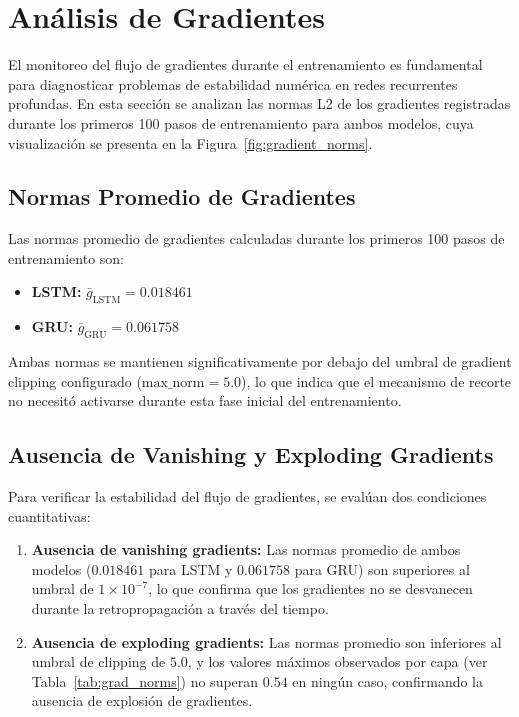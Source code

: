 \section{Análisis de Gradientes}

El monitoreo del flujo de gradientes durante el entrenamiento es fundamental para
diagnosticar problemas de estabilidad numérica en redes recurrentes profundas. En
esta sección se analizan las normas L2 de los gradientes registradas durante los
primeros 100 pasos de entrenamiento para ambos modelos, cuya visualización se
presenta en la Figura~\ref{fig:gradient_norms}.

\subsection{Normas Promedio de Gradientes}

Las normas promedio de gradientes calculadas durante los primeros 100 pasos de
entrenamiento son:

\begin{itemize}
    \item \textbf{LSTM:} $\bar{g}_{\text{LSTM}} = 0.018461$
    \item \textbf{GRU:} $\bar{g}_{\text{GRU}} = 0.061758$
\end{itemize}

Ambas normas se mantienen significativamente por debajo del umbral de gradient
clipping configurado ($\text{max\_norm} = 5.0$), lo que indica que el mecanismo
de recorte no necesitó activarse durante esta fase inicial del entrenamiento.

\subsection{Ausencia de Vanishing y Exploding Gradients}

Para verificar la estabilidad del flujo de gradientes, se evalúan dos condiciones
cuantitativas:

\begin{enumerate}
    \item \textbf{Ausencia de vanishing gradients:} Las normas promedio de ambos
    modelos ($0.018461$ para LSTM y $0.061758$ para GRU) son superiores al umbral
    de $1 \times 10^{-7}$, lo que confirma que los gradientes no se desvanecen
    durante la retropropagación a través del tiempo.
    \item \textbf{Ausencia de exploding gradients:} Las normas promedio son
    inferiores al umbral de clipping de $5.0$, y los valores máximos observados
    por capa (ver Tabla~\ref{tab:grad_norms}) no superan $0.54$ en ningún caso,
    confirmando la ausencia de explosión de gradientes.
\end{enumerate}

